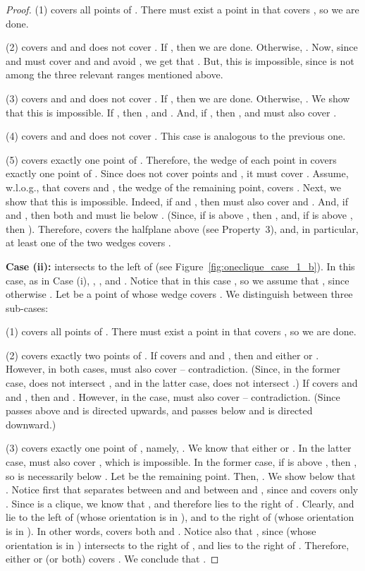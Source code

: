 \documentclass[11pt]{article}
\newcommand{\old}[1]{{{}}}
\begin{document}
\begin{proof}
(1)  covers all points of . There must exist a point in  that covers , so we are done. 

(2)  covers  and  and does not cover . If , then we are done. Otherwise, . Now, since  and  must cover  and  and avoid , we get that . But, this is impossible, since  is not among the three relevant ranges mentioned above. 

(3)  covers  and  and does not cover . If , then we are done. Otherwise, . We show that this is impossible.
If , then , and . And, if , then , and  must also cover .

(4)  covers  and  and does not cover . This case is analogous to the previous one.


\old{
If , then we are done. Otherwise, .
We show that this is impossible.
If  , then , and . And, if , then , and  must also cover .
}

(5)  covers exactly one point of . Therefore, the wedge of each point in  covers exactly one point of . Since  does not cover points  and , it must cover .
Assume, w.l.o.g., that  covers  and , the wedge of the remaining point, covers . Next, we show that this is impossible.
Indeed, if  and , then  must also cover  and . 
And, if  and , then both  and  must lie below . (Since, if  is above , then , and, if  is above , then ). Therefore,  covers the halfplane above  (see Property~3), and, in particular, at least one of the two wedges covers .



{\bf Case (ii):}  intersects  to the left of  (see Figure~\ref{fig:oneclique_case_1_b}). In this case, as in Case (i), , , and
. Notice that in this case , so we assume that
, since otherwise . Let  be a point of  whose wedge covers
. We distinguish between three sub-cases:

(1)  covers all points of . There must exist a point in  that covers , so we are done.

(2)  covers exactly two points of . If  covers  and  and , then  and either  or .
However, in both cases,  must also cover  -- contradiction. (Since, in the former case,  does not intersect , and in the latter case,  does not intersect .) If  covers  and  and , then  and . However, in the case,  must also cover  -- contradiction. (Since  passes above  and is directed upwards, and  passes below  and is directed downward.)

(3)  covers exactly one point of , namely, . We know that either  or . In the latter case,  must also cover , which is impossible. In the former case, if  is above , then , so  is necessarily below .
Let  be the remaining point. Then, . We show below that . 
Notice first that  separates between  and  and between  and , since  and  covers only . Since  is a clique, we know that , and therefore  lies to the right of . Clearly,  and  lie to the left of  (whose orientation is in ), and to the right of  (whose orientation is in ). In other words,  covers both  and . Notice also that , since  (whose orientation is in ) intersects  to the right of , and  lies to the right of . Therefore, either  or  (or both) covers . We conclude that .  
 


\end{proof}
\end{document}
